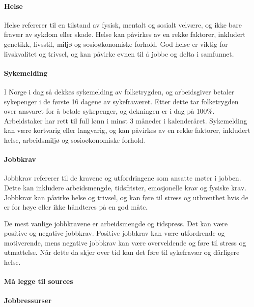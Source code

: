 \documentclass[
  12pt,
  a4paper,
  DIV=11,
  numbers=noendperiod]{scrartcl}
\let\oldparagraph\paragraph
\renewcommand{\paragraph}[1]{\oldparagraph{#1}\mbox{}}
\begin{document}
\paragraph{Helse}\label{helse}

Helse refererer til en tilstand av fysisk, mentalt og sosialt velvære,
og ikke bare fravær av sykdom eller skade. Helse kan påvirkes av en
rekke faktorer, inkludert genetikk, livsstil, miljø og sosioøkonomiske
forhold. God helse er viktig for livskvalitet og trivsel, og kan påvirke
evnen til å jobbe og delta i samfunnet.

\paragraph{Sykemelding}\label{sykemelding}

I Norge i dag så dekkes sykemelding av folketrygden, og arbeidsgiver
betaler sykepenger i de første 16 dagene av sykefraværet. Etter dette
tar folketrygden over ansvaret for å betale sykepenger, og dekningen er
i dag på 100\%. Arbeidstaker har rett til full lønn i minst 3 måneder i
kalenderåret. Sykemelding kan være kortvarig eller langvarig, og kan
påvirkes av en rekke faktorer, inkludert helse, arbeidsmiljø og
sosioøkonomiske forhold.

\paragraph{Jobbkrav}\label{jobbkrav}

Jobbkrav refererer til de kravene og utfordringene som ansatte møter i
jobben. Dette kan inkludere arbeidsmengde, tidsfrister, emosjonelle krav
og fysiske krav. Jobbkrav kan påvirke helse og trivsel, og kan føre til
stress og utbrenthet hvis de er for høye eller ikke håndteres på en god
måte.

De mest vanlige jobbkravene er arbeidsmengde og tidspress. Det kan være
positive og negative jobbkrav. Positive jobbkrav kan være utfordrende og
motiverende, mens negative jobbkrav kan være overveldende og føre til
stress og utmattelse. Når dette da skjer over tid kan det føre til
sykefravær og dårligere helse.

\paragraph{Må legge til sources}\label{muxe5-legge-til-sources}

\paragraph{Jobbressurser}\label{jobbressurser}
\end{document}
